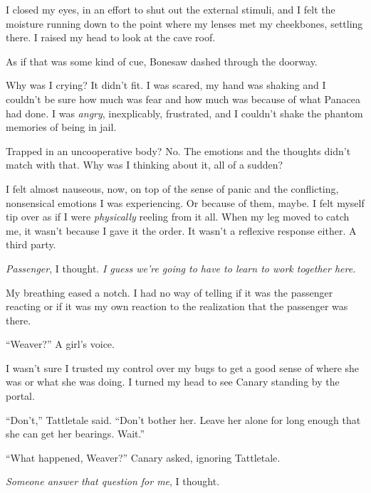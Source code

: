 I closed my eyes, in an effort to shut out the external stimuli, and I felt the moisture running down to the point where my lenses met my cheekbones, settling there.  I raised my head to look at the cave roof.



As if that was some kind of cue, Bonesaw dashed through the doorway.



Why was I crying?  It didn't fit.  I was scared, my hand was shaking and I couldn't be sure how much was fear and how much was because of what Panacea had done\emph{.  }I was \emph{angry}, inexplicably, frustrated, and I couldn't shake the phantom memories of being in jail.



Trapped in an uncooperative body?  No.  The emotions and the thoughts didn't match with that.  Why was I thinking about it, all of a sudden?



I felt almost nauseous, now, on top of the sense of panic and the conflicting, nonsensical emotions I was experiencing.  Or because of them, maybe.  I felt myself tip over as if I were \emph{physically} reeling from it all.  When my leg moved to catch me, it wasn't because I gave it the order.  It wasn't a reflexive response either.  A third party.



\emph{Passenger}, I thought.  \emph{I guess we're going to have to learn to work together here.}



My breathing eased a notch.  I had no way of telling if it was the passenger reacting or if it was my own reaction to the realization that the passenger was there.



``Weaver?''  A girl's voice.



I wasn't sure I trusted my control over my bugs to get a good sense of where she was or what she was doing.  I turned my head to see Canary standing by the portal.



``Don't,'' Tattletale said.  ``Don't bother her.  Leave her alone for long enough that she can get her bearings.  Wait.''



``What happened, Weaver?''  Canary asked, ignoring Tattletale.



\emph{Someone answer that question for me}, I thought.



